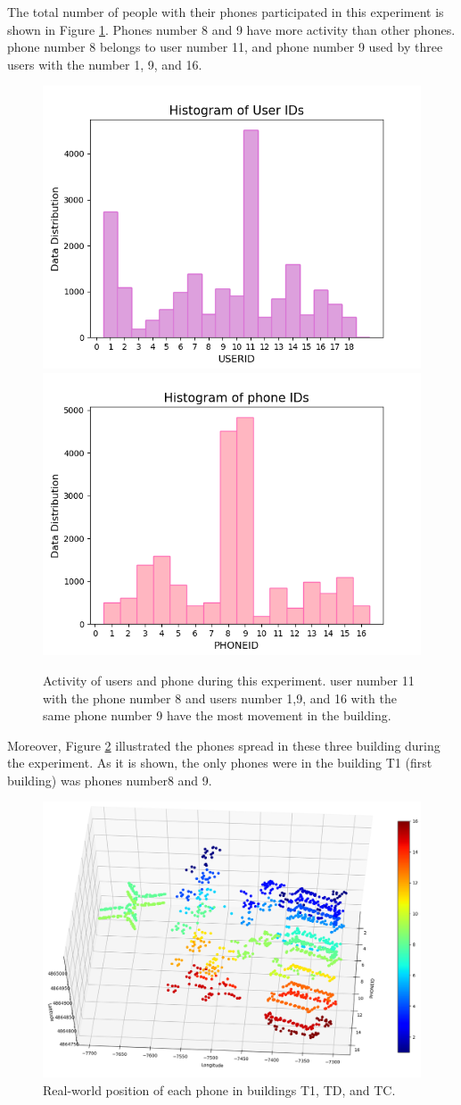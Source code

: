 \documentclass[../UNBThesis2.tex]{subfiles}
\begin{document}
The total number of people with their phones participated in this experiment is shown in Figure \ref{userphone}. Phones number 8 and 9 have more activity than other phones. phone number 8 belongs to user number 11, and phone number 9 used by three users with the number 1, 9, and 16.

\begin{figure}[!h]
    \centering
    \includegraphics[width=.5\textwidth]{image/Chapters/Chapter6/userID_data.png}\hfill
    \includegraphics[width=.5\textwidth]{image/Chapters/Chapter6/phoneID_data.png}
    \\[\smallskipamount]    
    \caption{Activity of users and phone during this experiment. user number 11 with the phone number 8 and users number 1,9, and 16 with the same phone number 9 have the most movement in the building.}
    \label{userphone}
\end{figure}


Moreover, Figure \ref{phoneall} illustrated the phones spread in these three building during the experiment. As it is shown, the only phones were in the building T1 (first building) was phones number8 and 9. 


\begin{figure}
    \centering
    \includegraphics[width = 10 cm]{image/Chapters/Chapter6/LatLongUser.png}
    \caption{Real-world position of each phone in buildings T1, TD, and TC.}
    \label{phoneall}
\end{figure}
\end{document}
